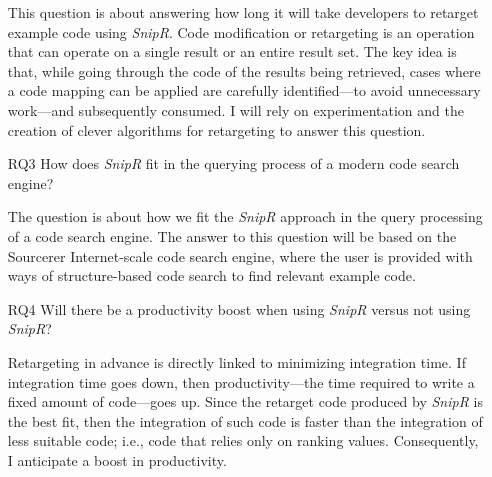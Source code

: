\begin{itemize}
	This question is about answering how long it will take developers to retarget example code 
	using \emph{SnipR}. Code modification or retargeting is an operation that can operate on a single result 
	or an entire result set. The key idea is that, while going through the code of the results being retrieved, 
	cases where a code mapping can be applied are carefully identified---to avoid unnecessary work---and subsequently 
	consumed. I will rely on experimentation and the creation of clever algorithms for retargeting to answer this 
	question.     
	
	
	\item[RQ3] How does \emph{SnipR} fit in the querying process of a modern code search engine?
	
	The question is about how we fit the \emph{SnipR} approach in the query processing of a 
	code search engine. The answer to this question will be based on the Sourcerer\cite{Bajracharya:2006vn} 
	Internet-scale code search engine, where the user is provided with ways of structure-based code search to 
	find relevant example code.
	
	\item[RQ4] Will there be a productivity boost when using \emph{SnipR} versus not using \emph{SnipR}?
	
	Retargeting in advance is directly linked to minimizing integration time. If integration time goes 
	down, then productivity---the time required to write a fixed amount of code---goes up. Since the 
	retarget code produced by \emph{SnipR} is the best fit, then the integration of such code is faster than the 
	integration of less suitable code; i.e., code that relies only on ranking values. Consequently, I anticipate a 
	boost in productivity.
		
\end{itemize}

